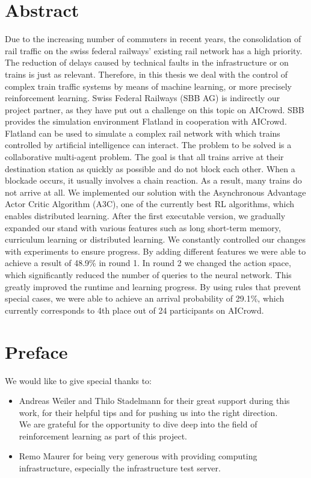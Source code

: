 \chapter*{Abstract}\label{abstract}
Due to the increasing number of commuters in recent years, the consolidation of rail traffic on the swiss federal railways' existing rail network has a high priority.
The reduction of delays caused by technical faults in the infrastructure or on trains is just as relevant.
Therefore, in this thesis we deal with the control of complex train traffic systems by means of machine learning, or more precisely reinforcement learning.
Swiss Federal Railways (SBB AG) is indirectly our project partner, as they have put out a challenge on this topic on AICrowd.
SBB provides the simulation environment Flatland in cooperation with AICrowd. Flatland can be used to simulate a complex rail network with which trains controlled by artificial intelligence can interact.
The problem to be solved is a collaborative multi-agent problem. The goal is that all trains arrive at their destination station as quickly as possible and do not block each other. When a blockade occurs, it usually involves a chain reaction. As a result, many trains do not arrive at all.
We implemented our solution with the Asynchronous Advantage Actor Critic Algorithm (A3C), one of the currently best RL algorithms, which enables distributed learning.
After the first executable version, we gradually expanded our stand with various features such as long short-term memory, curriculum learning or distributed learning.
We constantly controlled our changes with experiments to ensure progress.
By adding different features we were able to achieve a result of 48.9\% in round 1.
In round 2 we changed the action space, which significantly reduced the number of queries to the neural network. This greatly improved the runtime and learning progress.
By using rules that prevent special cases, we were able to achieve an arrival probability of 29.1\%, which currently corresponds to 4th place out of 24 participants on AICrowd.


\chapter*{Preface}\label{preface}
We would like to give special thanks to:
\begin{itemize}
    \item Andreas Weiler and Thilo Stadelmann for their great support during this work, for their helpful tips and for pushing us into the right direction.\\
    We are grateful for the opportunity to dive deep into the field of reinforcement learning as part of this project.
    \item Remo Maurer for being very generous with providing computing infrastructure, especially the infrastructure test server.
\end{itemize}

